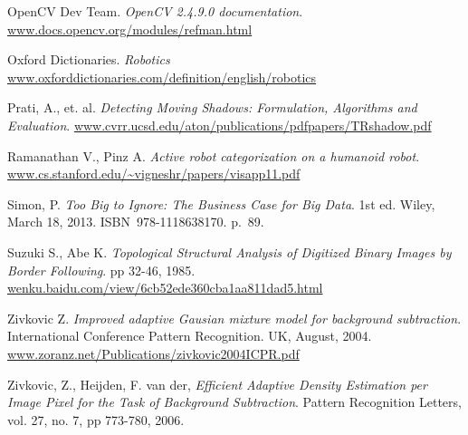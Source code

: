 \begin{thebibliography}{99999}
		OpenCV Dev Team.
		\emph{OpenCV 2.4.9.0 documentation}.
		\url{www.docs.opencv.org/modules/refman.html}

		Oxford Dictionaries.
		\emph{Robotics}
		\url{www.oxforddictionaries.com/definition/english/robotics}

		Prati, A., et. al.
		\emph{Detecting Moving Shadows: Formulation, Algorithms and Evaluation}.
		\url{www.cvrr.ucsd.edu/aton/publications/pdfpapers/TRshadow.pdf}

		Ramanathan V., Pinz A.
		\emph{Active robot categorization on a humanoid robot}.
		\url{www.cs.stanford.edu/~vigneshr/papers/visapp11.pdf}

		Simon, P.
		\emph{Too Big to Ignore: The Business Case for Big Data}.
		1st ed.
		Wiley,
		March 18, 2013.
		ISBN 978-1118638170.
	 	p. 89.

		Suzuki S., Abe K.
		\emph{Topological Structural Analysis of Digitized Binary Images by Border Following}.
		pp 32-46, 1985.
		\url{wenku.baidu.com/view/6cb52ede360cba1aa811dad5.html}








		Zivkovic Z. 
		\emph{Improved adaptive Gausian mixture model for background subtraction}.
		International Conference Pattern Recognition.
		UK, August, 2004.
		\url{www.zoranz.net/Publications/zivkovic2004ICPR.pdf}

		Zivkovic, Z., Heijden, F. van der,
		\emph{Efficient Adaptive Density Estimation per Image Pixel for the Task of Background Subtraction}.
		Pattern Recognition Letters,
		vol. 27, no. 7, pp 773-780, 2006.















\end{thebibliography}
